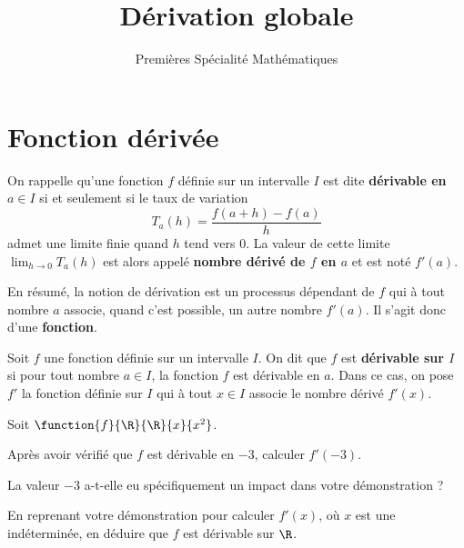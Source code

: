 \documentclass{article}
\title{Dérivation globale}
\author{Premières Spécialité Mathématiques}
\date{}
\begin{document}
\maketitle
\section{Fonction dérivée}
\begin{remark}
On rappelle qu'une fonction $f$ définie sur un intervalle $I$ est dite \textbf{dérivable en $a \in I$} si et seulement si le taux de variation
\begin{equation*}
T_a(h) = \dfrac{f(a+h)-f(a)}{h}
\end{equation*}
admet une limite finie quand $h$ tend vers $0$. La valeur de cette limite $\lim_{h \to 0} T_a(h)$ est alors appelé \textbf{nombre dérivé de $f$ en $a$} et est noté $f'(a)$.

En résumé, la notion de dérivation est un processus dépendant de $f$ qui à tout nombre $a$ associe, quand c'est possible, un autre nombre $f'(a)$. Il s'agit donc d'une \textbf{fonction}.
\end{remark}
\begin{tcolorbox}
\begin{definition}
Soit $f$ une fonction définie sur un intervalle $I$. On dit que $f$ est \textbf{dérivable sur $I$} si pour tout nombre $a \in I$, la fonction $f$ est dérivable en $a$. Dans ce cas, on pose $f'$ la fonction définie sur $I$ qui à tout $x \in I$ associe le nombre dérivé $f'(x)$.  
\end{definition}
\end{tcolorbox}
\begin{example}
Soit $\function{f}{\R}{\R}{x}{x^2}$.

\begin{enumquestions}
\item Après avoir vérifié que $f$ est dérivable en $-3$, calculer $f'(-3)$.

\emptybox{5cm}
\item La valeur $-3$ a-t-elle eu spécifiquement un impact dans votre démonstration ? \answersline
\item En reprenant votre démonstration pour calculer $f'(x)$, où $x$ est une indéterminée, en déduire que $f$ est dérivable sur $\R$.

\emptybox{5cm}
\end{enumquestions}
\end{example}
\newpage
\end{document}
